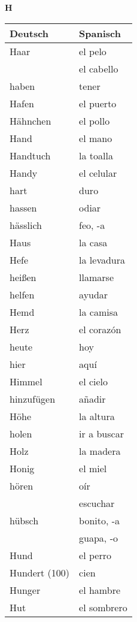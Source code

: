 \begin{flushright}\begin{Huge}\textbf{H}\end{Huge}\end{flushright}

\begin{longtable}{p{} p{}} 
\textbf{Deutsch}     & \textbf{Spanisch}                                       \\ \hline
\hline
\endhead %
Haar & el pelo\\
~ & el cabello\\
haben & tener\\
Hafen & el puerto\\
Hähnchen & el pollo\\
Hand & el mano\\
Handtuch & la toalla\\
Handy & el celular\\
hart & duro\\
hassen & odiar\\
hässlich & feo, -a\\
Haus & la casa\\
Hefe & la levadura\\
heißen & llamarse\\
helfen & ayudar\\
Hemd & la camisa\\
Herz  & el corazón \\
heute & hoy\\
hier & aquí\\
Himmel & el cielo\\
hinzufügen & añadir\\
Höhe & la altura \\
holen & ir a buscar\\
Holz & la madera\\
Honig & el miel\\
hören & oír\\
~ & escuchar\\
hübsch & bonito, -a\\
~ & guapa, -o\\
Hund & el perro\\
Hundert (100) & cien\\
Hunger & el hambre\\
Hut & el sombrero\\

\end{longtable}
